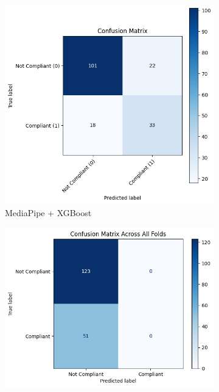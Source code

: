\documentclass[12pt,a4paper,openright,twoside]{book}
\begin{document}
\begin{figure}[htbp]
    \centering
    \begin{subfigure}{0.45\textwidth}
        \centering
        \includegraphics[width=\linewidth]{figures/mediapipe_xgboost_confusion_matrix.png}
        \caption{MediaPipe + XGBoost}
        \label{fig:mediapipe_xgboost_confusion_matrix}
    \end{subfigure}
    \hfill
    \begin{subfigure}{0.45\textwidth}
        \centering
        \includegraphics[width=\linewidth]{figures/mediapipe_keras_confusion_matrix.png}

\end{subfigure}
\end{figure}
\end{document}
